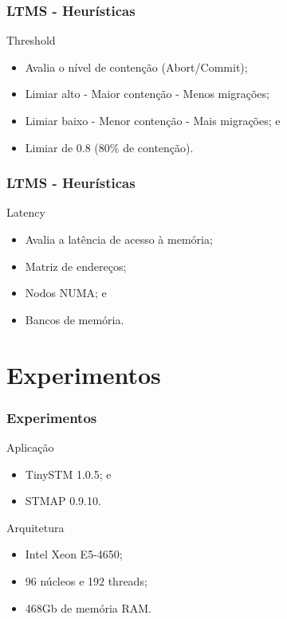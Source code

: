 \documentclass[10pt, pdf,xcolor=pdftex,dvipsnames,table]{beamer}
\begin{document}
\begin{frame} \frametitle{LTMS - Heurísticas}
    \begin{block}{Threshold}
        \begin{itemize}
        	\item Avalia o nível de contenção (Abort/Commit);
        	\item Limiar alto - Maior contenção - Menos migrações;
        	\item Limiar baixo - Menor contenção - Mais migrações; e
        	\item Limiar de 0.8 (80\% de contenção).
        \end{itemize}
    \end{block}
\end{frame}

\begin{frame} \frametitle{LTMS - Heurísticas}
    \begin{block}{Latency}
        \begin{itemize}
        	\item Avalia a latência de acesso à memória;
        	\item Matriz de endereços;
        	\item Nodos NUMA; e
        	\item Bancos de memória.
        \end{itemize}
    \end{block}
\end{frame}

\section{Experimentos}
\begin{frame} \frametitle{Experimentos}
    \begin{block}{Aplicação}
        \begin{itemize}
            \item TinySTM 1.0.5; e
            \item STMAP 0.9.10.
        \end{itemize}
    \end{block}
 
    \begin{block}{Arquitetura}
        \begin{itemize}
        	\item Intel Xeon E5-4650;
            \item 96 núcleos e 192 threads;
            \item 468Gb de memória RAM.
        \end{itemize}
    \end{block}
\end{frame}
\end{document}
